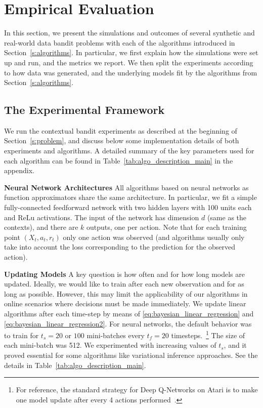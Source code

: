 \documentclass{article} \usepackage{iclr2018_conference,times}
\begin{document}
 \section{Empirical Evaluation}\label{s:experiments}

In this section, we present the simulations and outcomes of several synthetic and real-world data bandit problems with each of the algorithms introduced in Section~\ref{s:algorithms}.
In particular, we first explain how the simulations were set up and run, and the metrics we report.
We then split the experiments according to how data was generated, and the underlying models fit by the algorithms from Section~\ref{s:algorithms}.






\subsection{The Experimental Framework}
We run the contextual bandit experiments as described at the beginning of Section~\ref{s:problem}, and discuss below some implementation details of both experiments and algorithms.
A detailed summary of the key parameters used for each algorithm can be found in Table~\ref{tab:algo_description_main} in the appendix.



\textbf{Neural Network Architectures}
All algorithms based on neural networks as function approximators share the same architecture.
In particular, we fit a simple fully-connected feedforward network with two hidden layers with 100 units each and ReLu activations.
The input of the network has dimension $d$ (same as the contexts), and there are $k$ outputs, one per action.
Note that for each training point $(X_t, a_t, r_t)$ only one action was observed (and algorithms usually only take into account the loss corresponding to the prediction for the observed action).

\textbf{Updating Models}
A key question is how often and for how long models are updated.
Ideally, we would like to train after each new observation and for as long as possible.
However, this may limit the applicability of our algorithms in online scenarios where decisions must be made immediately.
We update linear algorithms after each time-step by means of \eqref{eq:bayesian_linear_regression} and \eqref{eq:bayesian_linear_regression2}.
For neural networks, the default behavior was to train for $t_s = 20$ or $100$ mini-batches every $t_f = 20$ timesteps.~\footnote{For reference, the standard strategy for Deep Q-Networks on Atari is to make one model update after every 4 actions performed~\citep{mnih2015,osband2016deep,Plappert17,Fortunato2017}.}
The size of each mini-batch was 512.
We experimented with increasing values of $t_s$, and it proved essential for some algorithms like variational inference approaches.
See the details in Table~\ref{tab:algo_description_main}.
\end{document}
